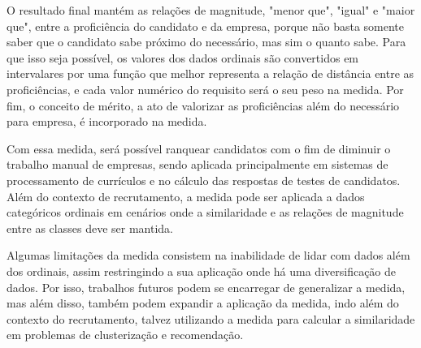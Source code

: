 \documentclass[preprint,12pt]{elsarticle}
\begin{document}
O resultado final mantém as relações de magnitude, "menor que", "igual" e "maior que", entre a proficiência do candidato e da empresa, porque não basta somente saber que o candidato sabe próximo do necessário, mas sim o quanto sabe. Para que isso seja possível, os valores dos dados ordinais são convertidos em intervalares por uma função que melhor representa a relação de distância entre as proficiências, e cada valor numérico do requisito será o seu peso na medida. Por fim, o conceito de mérito, a ato de valorizar as proficiências além do necessário para empresa, é incorporado na medida.

Com essa medida, será possível ranquear candidatos com o fim de diminuir o trabalho manual de empresas, sendo aplicada principalmente em sistemas de processamento de currículos e no cálculo das respostas de testes de candidatos. Além do contexto de recrutamento, a medida pode ser aplicada a dados categóricos ordinais em cenários onde a similaridade e as relações de magnitude entre as classes deve ser mantida.

Algumas limitações da medida consistem na inabilidade de lidar com dados além dos ordinais, assim restringindo a sua aplicação onde há uma diversificação de dados. Por isso, trabalhos futuros podem se encarregar de generalizar a medida, mas além disso, também podem expandir a aplicação da medida, indo além do contexto do recrutamento, talvez utilizando a medida para calcular a similaridade em problemas de clusterização e recomendação. 

\appendix


  
 





\end{document}
